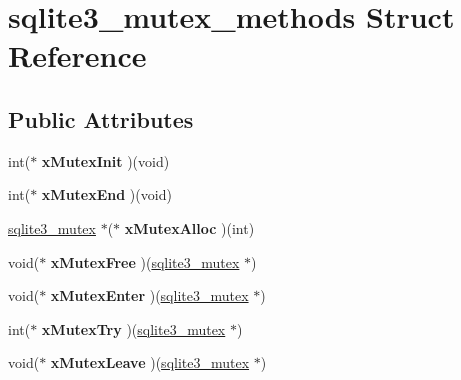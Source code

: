 \hypertarget{structsqlite3__mutex__methods}{\section{sqlite3\-\_\-mutex\-\_\-methods Struct Reference}
\label{structsqlite3__mutex__methods}
}
\subsection*{Public Attributes}
\begin{DoxyCompactItemize}
\item 
\hypertarget{structsqlite3__mutex__methods_af0a78d79b6029444d4a2ac7c474030d4}{int($\ast$ {\bfseries x\-Mutex\-Init} )(void)}\label{structsqlite3__mutex__methods_af0a78d79b6029444d4a2ac7c474030d4}

\item 
\hypertarget{structsqlite3__mutex__methods_a4963efb4bfede244d4d2a14510dbfe68}{int($\ast$ {\bfseries x\-Mutex\-End} )(void)}\label{structsqlite3__mutex__methods_a4963efb4bfede244d4d2a14510dbfe68}

\item 
\hypertarget{structsqlite3__mutex__methods_a1092d5c1659c494c5235e884def5e275}{\hyperlink{structsqlite3__mutex}{sqlite3\-\_\-mutex} $\ast$($\ast$ {\bfseries x\-Mutex\-Alloc} )(int)}\label{structsqlite3__mutex__methods_a1092d5c1659c494c5235e884def5e275}

\item 
\hypertarget{structsqlite3__mutex__methods_a4e58d446a7225ce91073eb0af91d219a}{void($\ast$ {\bfseries x\-Mutex\-Free} )(\hyperlink{structsqlite3__mutex}{sqlite3\-\_\-mutex} $\ast$)}\label{structsqlite3__mutex__methods_a4e58d446a7225ce91073eb0af91d219a}

\item 
\hypertarget{structsqlite3__mutex__methods_ac60f7bb165e9770949a8a2b2c2632830}{void($\ast$ {\bfseries x\-Mutex\-Enter} )(\hyperlink{structsqlite3__mutex}{sqlite3\-\_\-mutex} $\ast$)}\label{structsqlite3__mutex__methods_ac60f7bb165e9770949a8a2b2c2632830}

\item 
\hypertarget{structsqlite3__mutex__methods_a45682df41bdfcb267a696090c80ebd06}{int($\ast$ {\bfseries x\-Mutex\-Try} )(\hyperlink{structsqlite3__mutex}{sqlite3\-\_\-mutex} $\ast$)}\label{structsqlite3__mutex__methods_a45682df41bdfcb267a696090c80ebd06}

\item 
\hypertarget{structsqlite3__mutex__methods_acfa193f9130bfc68caf7f1849bcd0dac}{void($\ast$ {\bfseries x\-Mutex\-Leave} )(\hyperlink{structsqlite3__mutex}{sqlite3\-\_\-mutex} $\ast$)}\label{structsqlite3__mutex__methods_acfa193f9130bfc68caf7f1849bcd0dac}


\end{DoxyCompactItemize}
